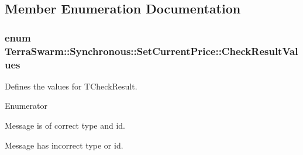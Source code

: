 \subsection{Member Enumeration Documentation}
\hypertarget{class_terra_swarm_1_1_synchronous_1_1_set_current_price_a0234ba20aa9372d9aaee3948bd008909}{
\subsubsection[{Check\-Result\-Values}]{\setlength{\rightskip}{0pt plus 5cm}enum {\bf Terra\-Swarm\-::\-Synchronous\-::\-Set\-Current\-Price\-::\-Check\-Result\-Values}}}\label{class_terra_swarm_1_1_synchronous_1_1_set_current_price_a0234ba20aa9372d9aaee3948bd008909}


Defines the values for T\-Check\-Result. 

\begin{Desc}
\item[Enumerator]\par
\begin{description}
\item[{\em 
\hypertarget{class_terra_swarm_1_1_synchronous_1_1_set_current_price_a0234ba20aa9372d9aaee3948bd008909a15e21f3992df9723770d59fa064c3827}{Success}\label{class_terra_swarm_1_1_synchronous_1_1_set_current_price_a0234ba20aa9372d9aaee3948bd008909a15e21f3992df9723770d59fa064c3827}
}]Message is of correct type and id. \item[{\em 
\hypertarget{class_terra_swarm_1_1_synchronous_1_1_set_current_price_a0234ba20aa9372d9aaee3948bd008909a67c062540d8320b92b10a0f371dbc32b}{Fail}\label{class_terra_swarm_1_1_synchronous_1_1_set_current_price_a0234ba20aa9372d9aaee3948bd008909a67c062540d8320b92b10a0f371dbc32b}
}]Message has incorrect type or id. \end{description}
\end{Desc}


